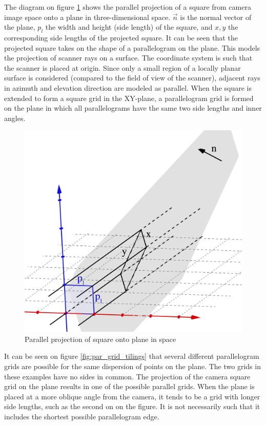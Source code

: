 The diagram on figure \ref{fig:pargrid_proj} shows the parallel projection of a square from camera image space onto a plane in three-dimensional space. $\vec{n}$ is the normal vector of the plane, $p_l$ the width and height (side length) of the square, and $x, y$ the corresponding side lengths of the projected square. It can be seen that the projected square takes on the shape of a parallelogram on the plane. This models the projection of scanner rays on a surface. The coordinate system is such that the scanner is placed at origin. Since only a small region of a locally planar surface is considered (compared to the field of view of the scanner), adjacent rays in azimuth and elevation direction are modeled as parallel. When the square is extended to form a square grid in the XY-plane, a parallelogram grid is formed on the plane in which all parallelograms have the same two side lengths and inner angles.

\begin{figure}[h]
\centering
\includegraphics[width=.4\textwidth]{fig/pargrid_proj.png}
\caption{Parallel projection of square onto plane in space}
\label{fig:pargrid_proj}
\end{figure}

It can be seen on figure \ref{fig:par_grid_tilings} that several different parallelogram grids are possible for the same dispersion of points on the plane. The two grids in these examples have no sides in common. The projection of the camera square grid on the plane results in one of the possible parallel grids. When the plane is placed at a more oblique angle from the camera, it tends to be a grid with longer side lengths, such as the second on on the figure. It is not necessarily such that it includes the shortest possible parallelogram edge.


